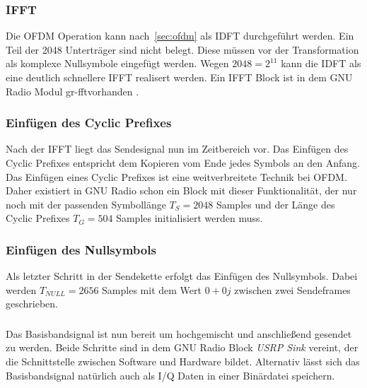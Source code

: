 \subsubsection{\ac{IFFT}}
Die OFDM Operation kann nach~\ref{sec:ofdm} als \ac{IDFT} durchgeführt werden. Ein Teil der 2048 Unterträger sind nicht belegt. Diese müssen vor der Transformation als komplexe Nullsymbole eingefügt werden. Wegen $2048 = 2^{11}$ kann die IDFT als eine deutlich schnellere IFFT realisert werden. Ein IFFT Block ist in dem GNU Radio Modul \dq gr-fft\dq vorhanden \cite{repo:gr-fft}.

\subsubsection{Einfügen des Cyclic Prefixes}
Nach der IFFT liegt das Sendesignal nun im Zeitbereich vor. Das Einfügen des Cyclic Prefixes entspricht dem Kopieren vom Ende jedes Symbols an den Anfang. Das Einfügen eines Cyclic Prefixes ist eine weitverbreitete Technik bei OFDM. Daher existiert in GNU Radio schon ein Block mit dieser Funktionalität, der nur noch mit der passenden Symbollänge $T_S = 2048$ Samples und der Länge des Cyclic Prefixes $T_G = 504$ Samples initialisiert werden muss.

\subsubsection{Einfügen des Nullsymbols}
Als letzter Schritt in der Sendekette erfolgt das Einfügen des Nullsymbols. Dabei werden $T_{NULL}=2656$ Samples mit dem Wert $0+0j$ zwischen zwei Sendeframes geschrieben.

\subsubsection{}
Das Basisbandsignal ist nun bereit um hochgemischt und anschließend gesendet zu werden. Beide Schritte sind in dem GNU Radio Block \textit{USRP Sink} vereint, der die Schnittstelle zwischen Software und Hardware bildet. Alternativ lässt sich das Basisbandsignal natürlich auch als I/Q Daten in einer Binärdatei speichern.